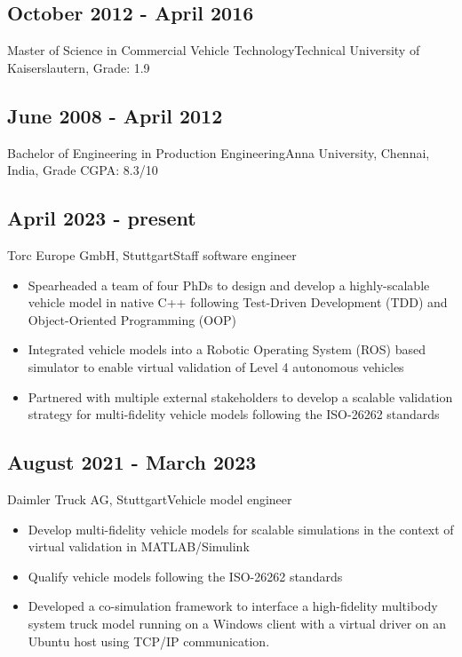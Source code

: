 \documentclass{mycv}
\begin{document}
\begin{paracol}{2}
        \subsection{October 2012 - April 2016}{Master of Science in Commercial Vehicle
        Technology}{Technical University of Kaiserslautern, {Grade: 1.9}}\\

        \subsection{June 2008 - April 2012}{Bachelor of Engineering in
            Production Engineering}{Anna University, Chennai, India, {Grade CGPA: 8.3/10}}\\

  \subsection{April 2023 - present}{Torc Europe GmbH, Stuttgart}{Staff software engineer}
        \begin{itemize}
          \item Spearheaded a team of four PhDs to design and develop a highly-scalable
              vehicle model in native C++ following Test-Driven Development
              (TDD) and Object-Oriented Programming (OOP)
          \item Integrated vehicle models into a Robotic Operating System (ROS)
              based simulator to enable virtual validation of Level 4
              autonomous vehicles
          \item Partnered with multiple external stakeholders to develop a
              scalable validation strategy for multi-fidelity vehicle models
              following the ISO-26262 standards
        \end{itemize}

  \subsection{August 2021 - March 2023}{Daimler Truck AG, Stuttgart}{Vehicle model engineer}
        \begin{itemize}
            \item Develop multi-fidelity vehicle models for scalable simulations in the context of
        virtual validation in MATLAB/Simulink
          \item Qualify vehicle models following the ISO-26262 standards 
          \item Developed a co-simulation framework to interface a
              high-fidelity multibody system truck model running on a Windows
              client with a virtual driver on an Ubuntu host using TCP/IP
              communication.
        \end{itemize}
\end{paracol}
\end{document}
